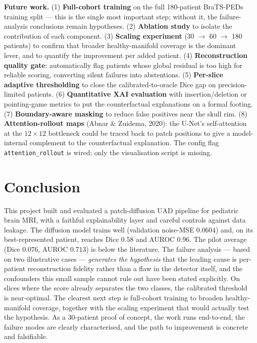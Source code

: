 \documentclass[12pt, a4paper]{article}
\theoremstyle{definition}\newtheorem{definition}{Definition}
\begin{document}
\textbf{Future work.}
(1) \textbf{Full-cohort training} on the full 180-patient BraTS-PEDs training split ---
this is the single most important step; without it, the failure-analysis conclusions
remain hypotheses.
(2) \textbf{Ablation study} to isolate the contribution of each component.
(3) \textbf{Scaling experiment} (30 $\to$ 60 $\to$ 180 patients) to confirm that
broader healthy-manifold coverage is the dominant lever, and to quantify the
improvement per added patient.
(4) \textbf{Reconstruction quality gate}: automatically flag patients whose global
residual is too high for reliable scoring, converting silent failures into abstentions.
(5) \textbf{Per-slice adaptive thresholding} to close the calibrated-to-oracle Dice
gap on precision-limited patients.
(6) \textbf{Quantitative XAI evaluation} with insertion/deletion or pointing-game
metrics to put the counterfactual explanations on a formal footing.
(7) \textbf{Boundary-aware masking} to reduce false positives near the skull rim.
(8) \textbf{Attention-rollout maps} (Abnar \& Zuidema, 2020): the U-Net's
self-attention at the $12{\times}12$ bottleneck could be traced back to patch
positions to give a model-internal complement to the counterfactual explanation.
The config flag \texttt{attention\_rollout} is wired; only the visualisation script
is missing.

\section{Conclusion}
This project built and evaluated a patch-diffusion UAD pipeline for pediatric brain MRI,
with a faithful explainability layer and careful controls against data leakage. The
diffusion model trains well (validation noise-MSE $0.0604$) and, on its best-represented
patient, reaches Dice $0.58$ and AUROC $0.96$. The pilot average (Dice $0.076$, AUROC
$0.713$) is below the literature. The failure analysis --- based on two illustrative
cases --- \emph{generates the hypothesis} that the leading cause is per-patient
reconstruction fidelity rather than a flaw in the detector itself, and the confounders
this small sample cannot rule out have been stated explicitly. On slices where the score
already separates the two classes, the calibrated threshold is near-optimal. The clearest
next step is full-cohort training to broaden healthy-manifold coverage, together with the
scaling experiment that would actually test the hypothesis. As a 30-patient proof of
concept, the work runs end-to-end, the failure modes are clearly characterised, and the
path to improvement is concrete and falsifiable.
\end{document}

